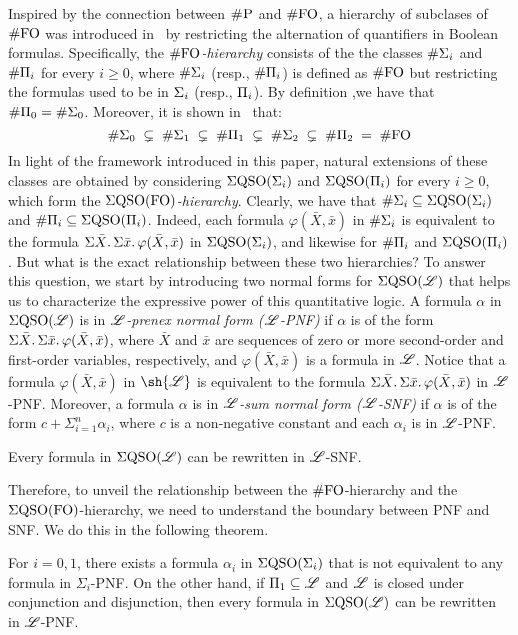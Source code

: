 
Inspired by the connection between $\text{\sc \#P}$ and $\#{\rm FO}$, a hierarchy of subclases of $\#{\rm FO}$ was introduced in~\cite{SalujaST95} 
by restricting the alternation of quantifiers in Boolean formulas.
Specifically, the \emph{$\#{\rm FO}$-hierarchy} consists of the 
the classes $\#\Sigma_{i}$ and $\#\Pi_{i}$ for every $i \geq 0$, where $\#\Sigma_{i}$ (resp., $\#\Pi_{i}$) is defined as $\#{\rm FO}$ but restricting the formulas used to be in $\Sigma_{i}$ (resp., $\Pi_{i}$).
By definition ,we have that $\#\Pi_{0} = \#\Sigma_{0}$. Moreover, it is shown in~\cite{SalujaST95} that:
\[
\#\Sigma_{0} \; \subsetneq \; \#\Sigma_{1} \; \subsetneq \; \#\Pi_{1} \; \subsetneq \; \#\Sigma_{2} \; \subsetneq \; \#\Pi_{2} \; = \; \#{\rm FO} 
\]
In light of the framework introduced in this paper, natural extensions of these classes are obtained by considering 
$\Sigma{\rm QSO}(\Sigma_{i})$ and $\Sigma{\rm QSO}(\Pi_{i})$ for every $i \geq 0$, which form the \emph{$\Sigma{\rm QSO}({\rm FO})$-hierarchy}.
Clearly, we have that $\#\Sigma_{i} \subseteq \Sigma{\rm QSO}(\Sigma_{i})$ and $\#\Pi_{i} \subseteq \Sigma{\rm QSO}(\Pi_{i})$. Indeed, each formula $\varphi(\bar{X}, \bar{x})$ in $\#\Sigma_{i}$ is equivalent to the formula $\Sigma{\bar X}.\, \Sigma{\bar x}.\, \varphi(\bar{X}, \bar{x})$ in $\Sigma{\rm QSO}(\Sigma_{i})$, and likewise for $\#\Pi_{i}$ and $\Sigma{\rm QSO}(\Pi_{i})$.
But what is the exact relationship between these two hierarchies?
To answer this question, we start by introducing two normal forms for $\Sigma{\rm QSO}(\mathscr{L})$ that helps us to characterize the expressive power of this quantitative logic.
A formula $\alpha$ in $\Sigma{\rm QSO}(\mathscr{L})$ is in \emph{$\mathscr{L}$-prenex normal form ($\mathscr{L}$-PNF)} 
if $\alpha$ is of the form
$\Sigma{\bar{X}}.\, \Sigma{\bar{x}}.\, \varphi(\bar{X}, \bar{x})$,
where $\bar{X}$ and $\bar{x}$ are sequences of zero or more second-order and first-order variables, respectively, and $\varphi(\bar{X}, \bar{x})$ is a formula in $\mathscr{L}$. Notice that 
a formula $\varphi(\bar{X}, \bar{x})$ in $\sh{\LL}$ is equivalent to the formula $\Sigma{\bar X}.\, \Sigma{\bar x}.\, \varphi(\bar{X}, \bar{x})$ in $\mathscr{L}$-PNF. 
Moreover, a formula $\alpha$ is in \emph{$\mathscr{L}$-sum normal form ($\mathscr{L}$-SNF)} if $\alpha$ is of the form $c + \Sigma_{i=1}^n \alpha_i$, where $c$ is a non-negative constant and each $\alpha_i$ is in 
$\mathscr{L}$-PNF.
\begin{theorem}\label{theo-pnf-snf}
Every formula in $\Sigma{\rm QSO}(\mathscr{L})$ can be rewritten in $\mathscr{L}$-SNF.
\end{theorem}
Therefore, to unveil the relationship between the $\#{\rm FO}$-hierarchy and the $\Sigma{\rm QSO}({\rm FO})$-hierarchy, we need to understand the boundary between PNF and SNF. We do this in the following theorem. 
\begin{theorem}\label{theo-pi1-pnf}
For $i = 0,1$, there exists a formula $\alpha_i$ in $\Sigma{\rm QSO}(\Sigma_{i})$ that is not equivalent to any formula in $\Sigma_i$-PNF. 
On the other hand, if $\Pi_{1} \subseteq \mathscr{L}$ and $\mathscr{L}$ is closed under conjunction and disjunction, then 
	every formula in
	$\Sigma{\rm QSO}(\mathscr{L})$ can be rewritten in $\mathscr{L}$-PNF. 
\end{theorem}


